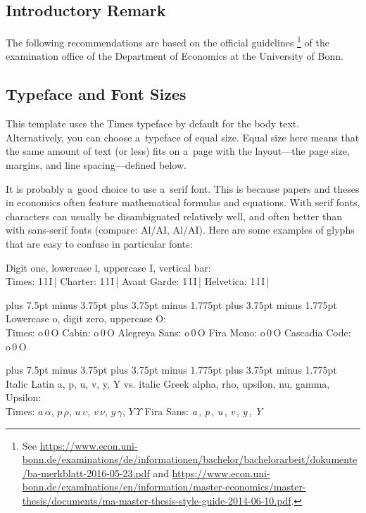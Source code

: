 \documentclass[12pt, a4paper, oneside]{article}
\newlength{\baselinedist}
\newlength{\smalllinespacing}
\newlength{\fsnormal}
\newlength{\fssmall}
\let \normalsizeOrig \normalsize
\let \smallOrig \small
\def\normalsize{%
		\normalsizeOrig%
		\fontsize{\fsnormal}{\baselinedist}\selectfont%
		\abovedisplayskip 13.5pt plus 6.75pt minus 3.375pt%
		\belowdisplayskip \abovedisplayskip%
		\abovedisplayshortskip 6.75pt plus 3.375pt minus 1.6875pt%
		\belowdisplayshortskip 6.75pt plus 3.375pt minus 1.6875pt%
	}
\def\normalsize{%
		\normalsizeOrig%
		\fontsize{\fsnormal}{\baselinedist}\selectfont%
		\abovedisplayskip 15pt plus 7.5pt minus 3.75pt%
		\belowdisplayskip \abovedisplayskip%
		\abovedisplayshortskip 7.5pt plus 3.75pt minus 1.775pt%
		\belowdisplayshortskip 7.5pt plus 3.75pt minus 1.775pt%
	}
\renewcommand{\small}{\smallOrig\fontsize{\fssmall}{\smalllinespacing}\selectfont}
\theoremstyle{Plain}
\theoremstyle{Definition}
\theoremstyle{Remark}
\begin{document}
\subsection{Introductory Remark}
The following recommendations are based on the official guidelines%
\footnote{See \url{https://www.econ.uni-bonn.de/examinations/de/informationen/bachelor/bachelorarbeit/dokumente/ba-merkblatt-2016-05-23.pdf} and \url{https://www.econ.uni-bonn.de/examinations/en/information/master-economics/master-thesis/documents/ma-master-thesis-style-guide-2014-06-10.pdf}.}
of the examination office of the Department of Economics at the University of Bonn.

\subsection{Typeface and Font Sizes}
This template uses the Times typeface by default for the body text. Alternatively, you can choose a~typeface of equal size. Equal size here means that the same amount of text (or less) fits on a~page with the layout---the page size, margins, and line spacing---defined below.

It is probably a~good choice to use a~serif font. This is because papers and theses in economics often feature mathematical formulas and equations. With serif fonts, characters can usually be disambiguated relatively well, and often better than with sans-serif fonts (compare: Al/AI, {\selectfont Al/AI}). Here are some examples of glyphs that are easy to confuse in particular fonts:
\begin{tcolorbox}[before upper = {\setlength{\parindent}{0pt}\setlength{\parskip}{\medskipamount}\strut}]
	Digit one, lowercase l, uppercase I, vertical bar: \\
	\small%
	{\selectfont Times: 1\,l\,I\,|} \quad
	{\selectfont Charter: 1\,l\,I\,|} \quad
	{\selectfont Avant Garde: 1\,l\,I\,|} \quad
	{\selectfont Helvetica: 1\,l\,I\,|} 
	\par
	\normalsize%
	Lowercase o, digit zero, uppercase O: \\
	\small%
	{\selectfont Times: o\,0\,O}\quad
	{\selectfont Cabin: o\,0\,O}\quad
	{\selectfont Alegreya Sans: o\,0\,O}\quad
	{\selectfont Fira Mono: o\,0\,O}\quad
	{\selectfont Cascadia Code: o\,0\,O}
	\par
	\normalsize%
	Italic Latin a, p, u, v, y, Y vs. italic Greek alpha, rho, upsilon, nu, gamma, Upsilon: \\
	\small%
	Times: $a \, \alpha$, $p \, \rho$, $u \, \upsilon$, $v \, \nu$, $y \, \gamma$, $Y \, \mathit{\Upsilon}$
	\quad
	{\selectfont Fira Sans: {\itshape a\,\textalpha}, {\itshape p\,\textrho}, {\itshape u\,\textupsilon}, {\itshape v\,\textnu}, {\itshape y\,\textgamma}, {\itshape Y\,\textUpsilon}}
\end{tcolorbox}
\end{document}
